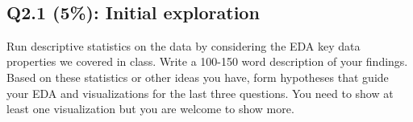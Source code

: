 \documentclass[11pt]{article}
\begin{document}
    \begin{center}
    \end{center}
    { \hspace*{\fill} \\}
    
    \subsection{Q2.1 (5\%): Initial
exploration}\label{q2.1-5-initial-exploration}

Run descriptive statistics on the data by considering the EDA key data
properties we covered in class. Write a 100-150 word description of your
findings. Based on these statistics or other ideas you have, form
hypotheses that guide your EDA and visualizations for the last three
questions. You need to show at least one visualization but you are
welcome to show more.
\end{document}
